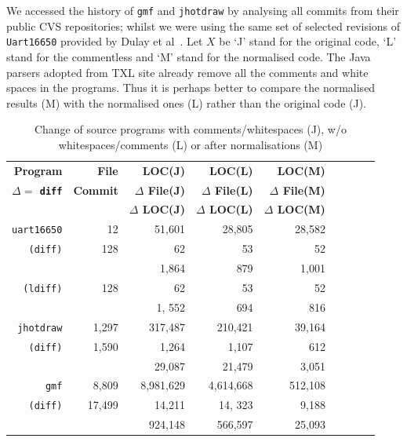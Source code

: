\documentclass[10pt, conference, compsocconf]{IEEEtran}
\begin{document}
{We accessed the history of {\tt gmf} and {\tt jhotdraw} by analysing all commits from their public CVS repositories; whilst we were using the same set of selected revisions of {\tt Uart16650} provided by Dulay et al~\cite{Duley:2010:PDA:1858996.1859093}. 
Let $X$ be `J' stand for the original code, `L' stand for the commentless and `M' stand for the normalised code. 
The Java parsers adopted from TXL site already remove all the comments and white spaces in the programs.  Thus it is perhaps better to compare the normalised results (M) with the normalised ones (L) rather than the original code (J).

\begin{table}\centering
\caption{Change of source programs with comments/whitespaces (J), w/o whitespaces/comments  (L) or after normalisations (M)\label{table:3}}
\begin{tabular}{| r || r || r | r | r || r | r| r|  r || }\hline
\bf \tiny Program & \bf  \tiny  File & \bf   \tiny  LOC(J) & \bf  \tiny  LOC(L) & \bf  \tiny  LOC(M) \\
\bf \tiny $\Delta=$ {\tt diff} & \bf  \tiny  Commit & \bf  \tiny  $\Delta$ File(J)  & \bf  \tiny $\Delta$ File(L) & \bf  \tiny  $\Delta$ File(M) \\  
             & \bf  \tiny  & \bf  \tiny  $\Delta$ LOC(J) & \bf  \tiny  $\Delta$ LOC(L) & \bf  \tiny  $\Delta$ LOC(M) \\  
\hline\hline
{\tt uart16650} & 12 & 51,601 & 28,805 & 28,582 \\
{\tt (diff)}  & 128 & 62 & 53 & 52\\
                & &1,864 & 879 & 1,001 \\
{\tt (ldiff)} & 128 & 62 & 53 &  52 \\
 & & 1, 552 &  694 &  816 \\
\hline
{\tt jhotdraw} & 1,297 & 317,487& 210,421 & 39,164 \\ 
{\tt (diff)} & 1,590 &1,264 & 1,107 & 612  \\
& & 29,087 	& 21,479 & 3,051 \\
\hline
{\tt gmf} & 8,809 &  8,981,629 & 4,614,668& 512,108\\
{\tt (diff)} &17,499 & 14,211 &  14, 323& 9,188 \\
  & &  924,148 & 566,597& 25,093 \\
\hline
\hline\end{tabular}
\end{table}

}
\end{document}
